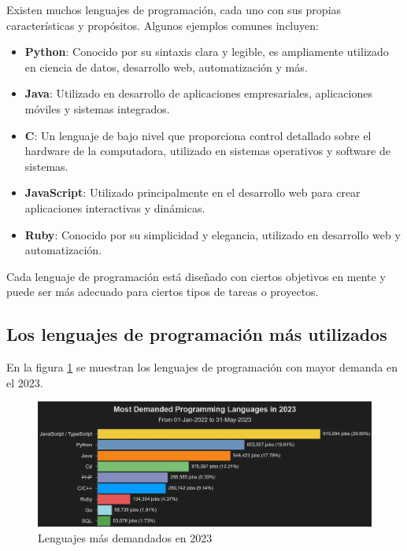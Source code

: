 Existen muchos lenguajes de programación, cada uno con sus propias
características y propósitos. Algunos ejemplos comunes incluyen:

\begin{itemize}
\item
  \textbf{Python}: Conocido por su sintaxis clara y legible, es
  ampliamente utilizado en ciencia de datos, desarrollo web,
  automatización y más.
\item
  \textbf{Java}: Utilizado en desarrollo de aplicaciones empresariales,
  aplicaciones móviles y sistemas integrados.
\item
  \textbf{C}: Un lenguaje de bajo nivel que proporciona control
  detallado sobre el hardware de la computadora, utilizado en sistemas
  operativos y software de sistemas.
\item
  \textbf{JavaScript}: Utilizado principalmente en el desarrollo web
  para crear aplicaciones interactivas y dinámicas.
\item
  \textbf{Ruby}: Conocido por su simplicidad y elegancia, utilizado en
  desarrollo web y automatización.
\end{itemize}

Cada lenguaje de programación está diseñado con ciertos objetivos en
mente y puede ser más adecuado para ciertos tipos de tareas o proyectos.

\subsection{Los lenguajes de programación más
utilizados}\label{los-lenguajes-de-programactightlistiuxf3n-muxe1s-utilizados}

En la figura \ref{fig:lenguajesDemandados} se muestran los lenguajes de programación con 
mayor demanda en el 2023.

\begin{figure}
  \centering
  \includegraphics[keepaspectratio]{img/lenguajes.png}
  \caption{Lenguajes más demandados en 2023}
  \label{fig:lenguajesDemandados}
\end{figure}


